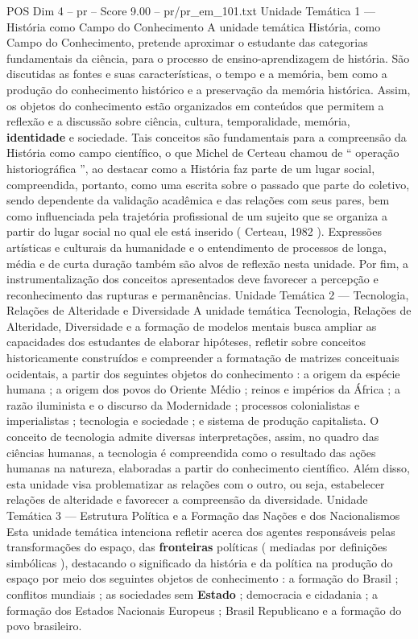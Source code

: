 \begin{textsample}{POS Dim 4 – pr – Score 9.00 – pr/pr\_em\_101.txt}  \label{ex:f4_pos_189}
Unidade Temática 1 — História como Campo do Conhecimento A unidade temática História, como Campo do Conhecimento, pretende aproximar o estudante das categorias fundamentais da ciência, para o processo de ensino-aprendizagem de história.
São discutidas as fontes e suas características, o tempo e a memória, bem como a produção do conhecimento histórico e a preservação da memória histórica.
Assim, os objetos do conhecimento estão organizados em conteúdos que permitem a reflexão e a discussão sobre ciência, cultura, temporalidade, memória, \textbf{identidade} e sociedade.
Tais conceitos são fundamentais para a compreensão da História como campo científico, o que Michel de Certeau chamou de “ operação historiográfica ”, ao destacar como a História faz parte de um lugar social, compreendida, portanto, como uma escrita sobre o passado que parte do coletivo, sendo dependente da validação acadêmica e das relações com seus pares, bem como influenciada pela trajetória profissional de um sujeito que se organiza a partir do lugar social no qual ele está inserido ( Certeau, 1982 ).
Expressões artísticas e culturais da humanidade e o entendimento de processos de longa, média e de curta duração também são alvos de reflexão nesta unidade.
Por fim, a instrumentalização dos conceitos apresentados deve favorecer a percepção e reconhecimento das rupturas e permanências.
Unidade Temática 2 — Tecnologia, Relações de Alteridade e Diversidade A unidade temática Tecnologia, Relações de Alteridade, Diversidade e a formação de modelos mentais busca ampliar as capacidades dos estudantes de elaborar hipóteses, refletir sobre conceitos historicamente construídos e compreender a formatação de matrizes conceituais ocidentais, a partir dos seguintes objetos do conhecimento : a origem da espécie humana ; a origem dos povos do Oriente Médio ; reinos e impérios da África ; a razão iluminista e o discurso da Modernidade ; processos colonialistas e imperialistas ; tecnologia e sociedade ; e sistema de produção capitalista.
O conceito de tecnologia admite diversas interpretações, assim, no quadro das ciências humanas, a tecnologia é compreendida como o resultado das ações humanas na natureza, elaboradas a partir do conhecimento científico.
Além disso, esta unidade visa problematizar as relações com o outro, ou seja, estabelecer relações de alteridade e favorecer a compreensão da diversidade.
Unidade Temática 3 — Estrutura Política e a Formação das Nações e dos Nacionalismos Esta unidade temática intenciona refletir acerca dos agentes responsáveis pelas transformações do espaço, das \textbf{fronteiras} políticas ( mediadas por definições simbólicas ), destacando o significado da história e da política na produção do espaço por meio dos seguintes objetos de conhecimento : a formação do Brasil ; conflitos mundiais ; as sociedades sem \textbf{Estado} ; democracia e cidadania ; a formação dos Estados Nacionais Europeus ; Brasil Republicano e a formação do povo brasileiro.

\end{textsample}

